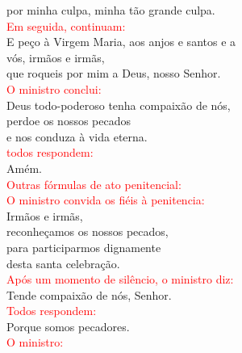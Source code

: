 \documentclass{book}
\begin{document}
\begin{flushleft}
    por minha culpa, minha tão grande culpa.
    \vspace{.1cm} \\
    \textcolor{red}{Em seguida, continuam:}
    \vspace{.1cm} \\
    E peço à Virgem Maria, aos anjos e santos e a \\
    vós, irmãos e irmãs, \\
    que roqueis por mim a Deus, nosso Senhor.
    \vspace{.1cm} \\
    \textcolor{red}{O ministro conclui:}
    \vspace{.1cm} \\
    Deus todo-poderoso tenha compaixão de nós, \\
    perdoe os nossos pecados \\
    e nos conduza à vida eterna.
    \vspace{.1cm} \\
    \textcolor{red}{todos respondem:}
    \vspace{.1cm} \\
    Amém.
    \vspace{.1cm} \\
    \textcolor{red}{Outras fórmulas de ato penitencial:}
    \vspace{.1cm} \\
    \textcolor{red}{O ministro convida os fiéis à penitencia:}
    \vspace{.1cm} \\
    Irmãos e irmãs, \\
    reconheçamos os nossos pecados, \\
    para participarmos dignamente \\
    desta santa celebração.
    \vspace{.1cm} \\
    \textcolor{red}{Após um momento de silêncio, o ministro diz:}
    \vspace{.1cm} \\
    Tende compaixão de nós, Senhor.
    \vspace{.1cm} \\
    \textcolor{red}{Todos respondem:}
    \vspace{.1cm} \\
    Porque somos pecadores.
    \vspace{.1cm} \\
    \textcolor{red}{O ministro:}
    \vspace{.1cm} \\

\end{flushleft}
\end{document}
